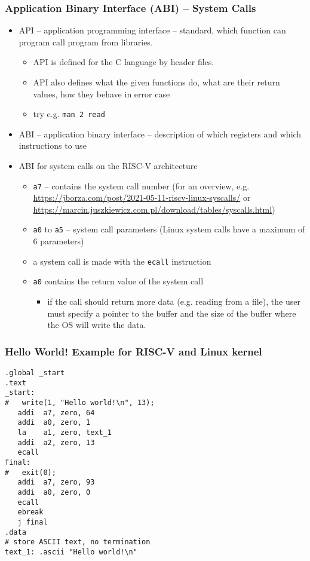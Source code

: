\documentclass{beamer}
\begin{document}
\begin{frame}[shrink=5]
\frametitle{Application Binary Interface (ABI) -- System Calls}

\begin{itemize}
\item API -- application programming interface -- standard, which function can program call program from libraries.
\begin{itemize}
\item API is defined for the C language by header files.
\item API also defines what the given functions do, what are their return values, how they behave in error case
\item try e.g. \texttt{man 2 read}
\end{itemize}
\item ABI -- application binary interface -- description of which registers and which instructions to use
\item ABI for system calls on the RISC-V architecture
\begin{itemize}
\item \texttt{a7} -- contains the system call number (for an overview, e.g. \url{https://jborza.com/post/2021-05-11-riscv-linux-syscalls/} or \url{https://marcin.juszkiewicz.com.pl/download/tables/syscalls.html})
\item \texttt{a0} to \texttt{a5} -- system call parameters (Linux system calls have a maximum of 6 parameters)
\item a system call is made with the \texttt{ecall} instruction
\item \texttt{a0} contains the return value of the system call
\begin{itemize}
\item if the call should return more data (e.g. reading from a file), the user must specify a pointer to the buffer and the size of the buffer where the OS will write the data.
\end{itemize}
\end{itemize}
\end{itemize}

\end{frame}

\begin{frame}[fragile]
\frametitle{Hello World! Example for RISC-V and Linux kernel}


\begin{verbatim}
.global _start
.text
_start:
#   write(1, "Hello world!\n", 13);
   addi  a7, zero, 64
   addi  a0, zero, 1
   la    a1, zero, text_1
   addi  a2, zero, 13
   ecall
final:
#   exit(0);
   addi  a7, zero, 93
   addi  a0, zero, 0
   ecall
   ebreak
   j final
.data
# store ASCII text, no termination
text_1: .ascii "Hello world!\n"
\end{verbatim}
\end{frame}
\end{document}
